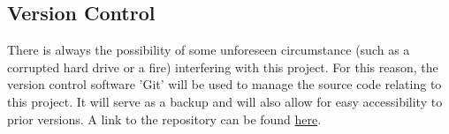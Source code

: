 \subsection{Version Control}
\label{subsec:versioncontrol}
There is always the possibility of some unforeseen circumstance (such as a corrupted hard drive or a fire) interfering with this project. For this reason, the version control software 'Git' will be used to manage the source code relating to this project. It will serve as a backup and will also allow for easy accessibility to prior versions. A link to the repository can be found \href{https://github.com/ILeybourne/COMP3931-Individual-Project-Learning-to-Texture-3D-Models}{here}. 